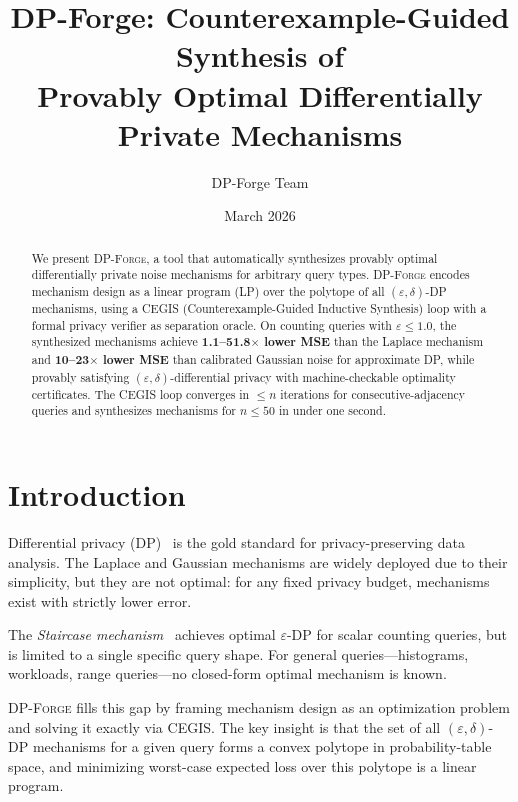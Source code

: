 \documentclass[11pt,a4paper]{article}
\title{DP-Forge: Counterexample-Guided Synthesis of\\Provably Optimal Differentially Private Mechanisms}
\author{DP-Forge Team}
\date{March 2026}
\begin{document}
\maketitle

\begin{abstract}
We present \textsc{DP-Forge}, a tool that automatically synthesizes provably optimal
differentially private noise mechanisms for arbitrary query types.  \textsc{DP-Forge}
encodes mechanism design as a linear program (LP) over the polytope of all
$(\varepsilon,\delta)$-DP mechanisms, using a CEGIS (Counterexample-Guided Inductive
Synthesis) loop with a formal privacy verifier as separation oracle.
On counting queries with $\varepsilon \le 1.0$, the synthesized mechanisms
achieve \textbf{1.1--51.8$\times$ lower MSE} than the Laplace mechanism
and \textbf{10--23$\times$ lower MSE} than calibrated Gaussian noise for
approximate DP, while provably satisfying $(\varepsilon,\delta)$-differential
privacy with machine-checkable optimality certificates.
The CEGIS loop converges in $\le n$ iterations for consecutive-adjacency
queries and synthesizes mechanisms for $n \le 50$ in under one second.
\end{abstract}

\section{Introduction}

Differential privacy (DP)~\cite{dwork2006calibrating} is the gold standard
for privacy-preserving data analysis.  The Laplace and Gaussian mechanisms
are widely deployed due to their simplicity, but they are not optimal:
for any fixed privacy budget, mechanisms exist with strictly lower error.

The \emph{Staircase mechanism}~\cite{geng2014optimal} achieves
optimal $\varepsilon$-DP for scalar counting queries, but is limited to a
single specific query shape.  For general queries---histograms, workloads,
range queries---no closed-form optimal mechanism is known.

\textsc{DP-Forge} fills this gap by framing mechanism design as an optimization
problem and solving it exactly via CEGIS.  The key insight is that the set of
all $(\varepsilon,\delta)$-DP mechanisms for a given query forms a convex polytope
in probability-table space, and minimizing worst-case expected loss over this
polytope is a linear program.
\end{document}
